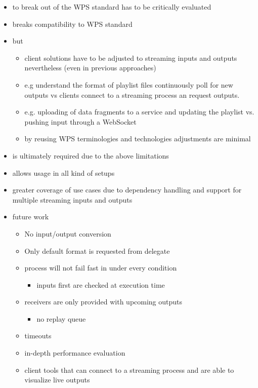 \begin{itemize}
\begin{itemize}
      \item to break out of the WPS standard has to be critically evaluated
      \item breaks compatibility to WPS standard
      \item but
      \begin{itemize}
        \item client solutions have to be adjusted to streaming inputs and outputs nevertheless (even in previous approaches)
        \item e.g understand the format of playlist files continuously poll for new outputs vs clients connect to a streaming process an request outputs.
        \item e.g. uploading of data fragments to a service and updating the playlist vs. pushing input through a WebSocket
        \item by reusing WPS terminologies and technologies adjustments are minimal
      \end{itemize}
      \item is ultimately required due to the above limitations
      \item allows usage in all kind of setups
      \item greater coverage of use cases due to dependency handling and support for multiple streaming inputs and outputs
      \item future work
      \begin{itemize}
        \item No input/output conversion
        \item Only default format is requested from delegate
        \item process will not fail fast in under every condition
        \begin{itemize}
          \item inputs first are checked at execution time
        \end{itemize}
        \item receivers are only provided with upcoming outputs
        \begin{itemize}
          \item no replay queue
        \end{itemize}
        \item timeouts
        \item in-depth performance evaluation
        \item client tools that can connect to a streaming process and are able to visualize live outputs
      \end{itemize}
    \end{itemize}
  \end{itemize}
